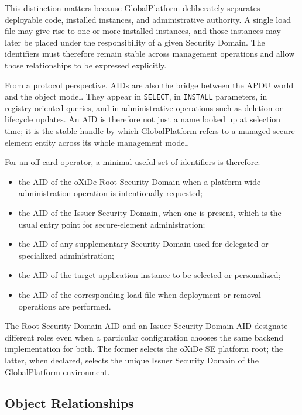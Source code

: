 This distinction matters because GlobalPlatform deliberately separates
deployable code, installed instances, and administrative authority. A
single load file may give rise to one or more installed instances, and
those instances may later be placed under the responsibility of a given
Security Domain. The identifiers must therefore remain stable across
management operations and allow those relationships to be expressed
explicitly.

From a protocol perspective, AIDs are also the bridge between the APDU
world and the object model. They appear in \texttt{SELECT}, in
\texttt{INSTALL} parameters, in registry-oriented queries, and in
administrative operations such as deletion or lifecycle updates. An AID
is therefore not just a name looked up at selection time; it is the
stable handle by which GlobalPlatform refers to a managed secure-element
entity across
its whole management model.

For an off-card operator, a minimal useful set of identifiers is
therefore:
\begin{itemize}
\item the AID of the oXiDe Root Security Domain when a platform-wide
  administration operation is intentionally requested;
\item the AID of the Issuer Security Domain, when one is present, which is the
  usual entry point for secure-element administration;
\item the AID of any supplementary Security Domain used for delegated or
  specialized administration;
\item the AID of the target application instance to be selected or
  personalized;
\item the AID of the corresponding load file when deployment or removal
  operations are performed.
\end{itemize}

The Root Security Domain AID and an Issuer Security Domain AID designate
different roles even when a particular configuration chooses the same backend
implementation for both. The former selects the oXiDe SE platform root; the
latter, when declared, selects the unique Issuer Security Domain of the
GlobalPlatform environment.

\subsection{Object Relationships}
\label{sec:gp-object-relationships}

